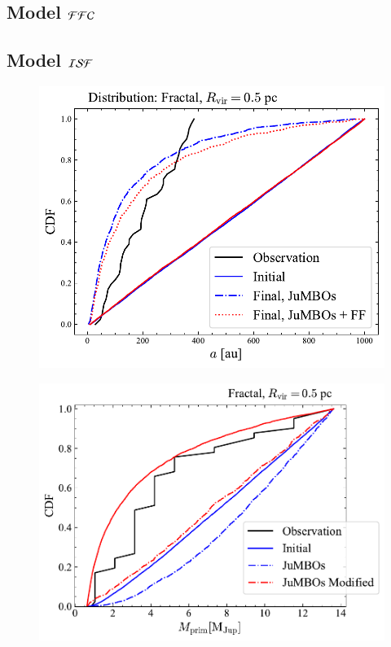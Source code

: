 \documentclass[aa]{lib/aa}
\begin{document}
\subsection{Model ${\cal FFC}$}

\subsection{Model ${\cal ISF}$}

\begin{figure}
    \centering
        \includegraphics[width=.91\columnwidth]{figures/sem_axis_Fractal_FF.pdf}
        \caption{}
         \label{Fig:Fr_semimajor_axis}
\end{figure}

\begin{figure}
    \centering
        \includegraphics[width=.91\columnwidth]{figures/mprim_vs_obs_Fractal0.5Mod.pdf}
        \caption{}
         \label{Fig:Fr_primar_mass}
\end{figure}
\end{document}
